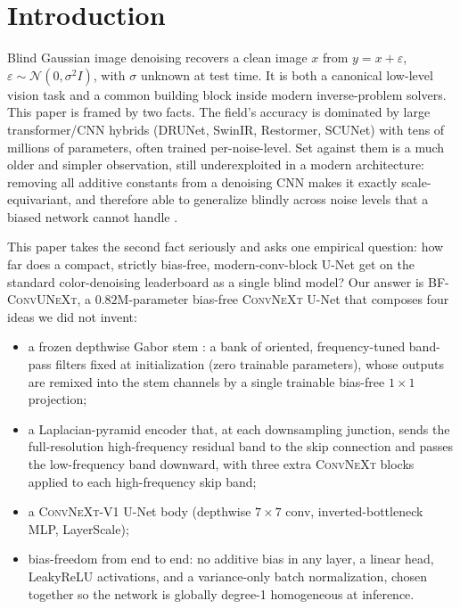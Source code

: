 \documentclass{article}
\newcommand{\model}{\textsc{BF-ConvUNeXt}}
\newcommand{\convnext}{\textsc{ConvNeXt}}
\begin{document}
\section{Introduction}
\label{sec:intro}

Blind Gaussian image denoising recovers a clean image $x$ from $y = x + \varepsilon$, $\varepsilon \sim \mathcal{N}(0,\sigma^2 I)$, with $\sigma$ unknown at test time. It is both a canonical low-level vision task and a common building block inside modern inverse-problem solvers. This paper is framed by two facts. The field's accuracy is dominated by large transformer/CNN hybrids (DRUNet, SwinIR, Restormer, SCUNet) with tens of millions of parameters, often trained per-noise-level. Set against them is a much older and simpler observation, still underexploited in a modern architecture: removing all additive constants from a denoising CNN makes it exactly scale-equivariant, and therefore able to generalize blindly across noise levels that a biased network cannot handle \citep{mohan2020biasfree}.

This paper takes the second fact seriously and asks one empirical question: how far does a compact, strictly bias-free, modern-conv-block U-Net get on the standard color-denoising leaderboard as a single blind model? Our answer is \model{}, a $0.82$M-parameter bias-free \convnext{} U-Net that composes four ideas we did not invent:

\begin{itemize}
  \item a frozen depthwise Gabor stem \citep{gabor1946}: a bank of oriented, frequency-tuned band-pass filters fixed at initialization (zero trainable parameters), whose outputs are remixed into the stem channels by a single trainable bias-free $1{\times}1$ projection;
  \item a Laplacian-pyramid encoder \citep{burt1983laplacian} that, at each downsampling junction, sends the full-resolution high-frequency residual band to the skip connection and passes the low-frequency band downward, with three extra \convnext{} blocks applied to each high-frequency skip band;
  \item a \convnext{}-V1 U-Net body \citep{liu2022convnext,ronneberger2015unet} (depthwise $7{\times}7$ conv, inverted-bottleneck MLP, LayerScale);
  \item bias-freedom from end to end: no additive bias in any layer, a linear head, LeakyReLU activations, and a variance-only batch normalization, chosen together so the network is globally degree-1 homogeneous at inference.
\end{itemize}
\end{document}
